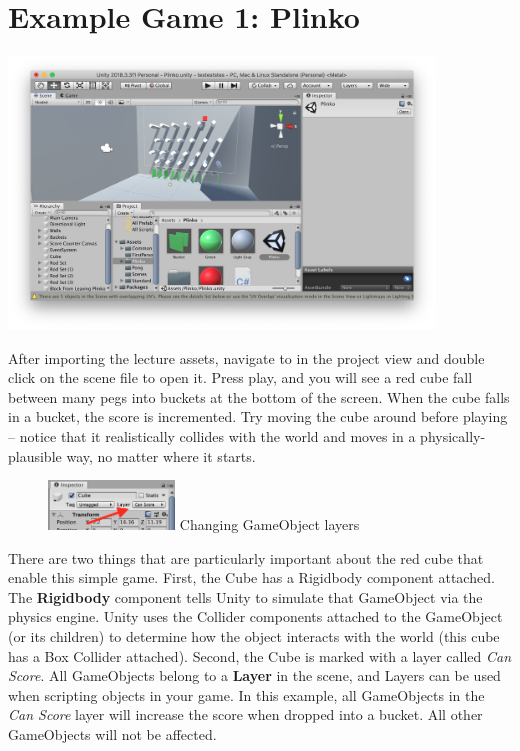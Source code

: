\documentclass[11pt]{article}
\begin{document}
\section{Example Game 1: Plinko}

\begin{center}
\centering \noindent
\includegraphics[width=0.85\textwidth]{plinko}
\end{center}

After importing the lecture assets, navigate to  in the project view and double click on the scene file to open it.  Press play, and you will see a red cube fall between many pegs into buckets at the bottom of the screen.  When the cube falls in a bucket, the score is incremented.  Try moving the cube around before playing -- notice that it realistically collides with the world and moves in a physically-plausible way, no matter where it starts.

\begin{figure}
    \centering
    \includegraphics[width=0.3\textwidth]{layers}
    Changing GameObject layers
\end{figure}
There are two things that are particularly important about the red cube that enable this simple game.  First, the Cube has a Rigidbody component attached.  The \textbf{Rigidbody} component tells Unity to simulate that GameObject via the physics engine.  Unity uses the Collider components attached to the GameObject (or its children) to determine how the object interacts with the world (this cube has a Box Collider attached).  Second, the Cube is marked with a layer called \textit{Can Score}.  All GameObjects belong to a \textbf{Layer} in the scene, and Layers can be used when scripting objects in your game.  In this example, all GameObjects in the \textit{Can Score} layer will increase the score when dropped into a bucket.  All other GameObjects will not be affected.
\end{document}
